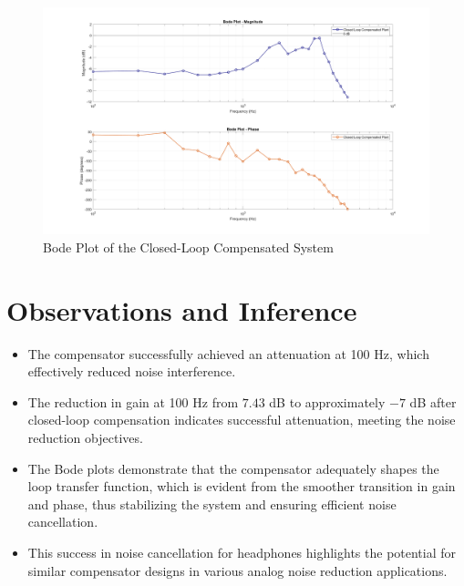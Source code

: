 \documentclass{article}
\begin{document}
\begin{figure}[!htb]
    \centering
    \includegraphics[width=\textwidth]{closed_loop_2.png}
    \caption{Bode Plot of the Closed-Loop Compensated System}
    \label{fig:bode_closed_loop}
\end{figure}

\newpage
\section{Observations and Inference}

\begin{itemize}%
    \item The compensator successfully achieved an attenuation at 100 Hz, which effectively reduced noise interference.
    \item The reduction in gain at 100 Hz from \( 7.43 \) dB to approximately \( -7 \) dB after closed-loop compensation indicates successful attenuation, meeting the noise reduction objectives.
    \item The Bode plots demonstrate that the compensator adequately shapes the loop transfer function, which is evident from the smoother transition in gain and phase, thus stabilizing the system and ensuring efficient noise cancellation.
    \item This success in noise cancellation for headphones highlights the potential for similar compensator designs in various analog noise reduction applications.
\end{itemize}
\end{document}
